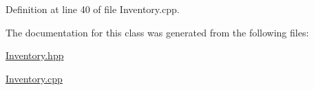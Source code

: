 Definition at line 40 of file Inventory.\-cpp.



The documentation for this class was generated from the following files\-:\begin{DoxyCompactItemize}
\item 
\hyperlink{_inventory_8hpp}{Inventory.\-hpp}\item 
\hyperlink{_inventory_8cpp}{Inventory.\-cpp}\end{DoxyCompactItemize}
